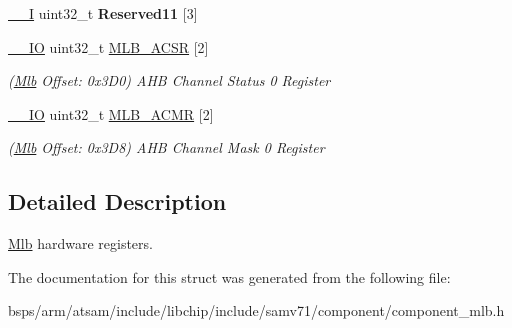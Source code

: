 \begin{DoxyCompactItemize}
\mbox{\label{structMlb_a33bbacfa1d44fcb5f1174238175f71a5}} 
\mbox{\hyperlink{core__cm7_8h_af63697ed9952cc71e1225efe205f6cd3}{\+\_\+\+\_\+I}} uint32\+\_\+t {\bfseries Reserved11} \mbox{[}3\mbox{]}
\item 
\mbox{\label{structMlb_ae84cea6d7a1086c11e89623eec1aec58}} 
\mbox{\hyperlink{core__cm7_8h_aec43007d9998a0a0e01faede4133d6be}{\+\_\+\+\_\+\+IO}} uint32\+\_\+t \mbox{\hyperlink{structMlb_ae84cea6d7a1086c11e89623eec1aec58}{M\+L\+B\+\_\+\+A\+C\+SR}} \mbox{[}2\mbox{]}
\begin{DoxyCompactList}\small\item\em (\mbox{\hyperlink{structMlb}{Mlb}} Offset\+: 0x3\+D0) A\+HB Channel Status 0 Register \end{DoxyCompactList}\item 
\mbox{\label{structMlb_ab254c28bd0589e81acbc5ae53a1cd41f}} 
\mbox{\hyperlink{core__cm7_8h_aec43007d9998a0a0e01faede4133d6be}{\+\_\+\+\_\+\+IO}} uint32\+\_\+t \mbox{\hyperlink{structMlb_ab254c28bd0589e81acbc5ae53a1cd41f}{M\+L\+B\+\_\+\+A\+C\+MR}} \mbox{[}2\mbox{]}
\begin{DoxyCompactList}\small\item\em (\mbox{\hyperlink{structMlb}{Mlb}} Offset\+: 0x3\+D8) A\+HB Channel Mask 0 Register \end{DoxyCompactList}\end{DoxyCompactItemize}


\subsection{Detailed Description}
\mbox{\hyperlink{structMlb}{Mlb}} hardware registers. 

The documentation for this struct was generated from the following file\+:\begin{DoxyCompactItemize}
\item 
bsps/arm/atsam/include/libchip/include/samv71/component/component\+\_\+mlb.\+h\end{DoxyCompactItemize}

